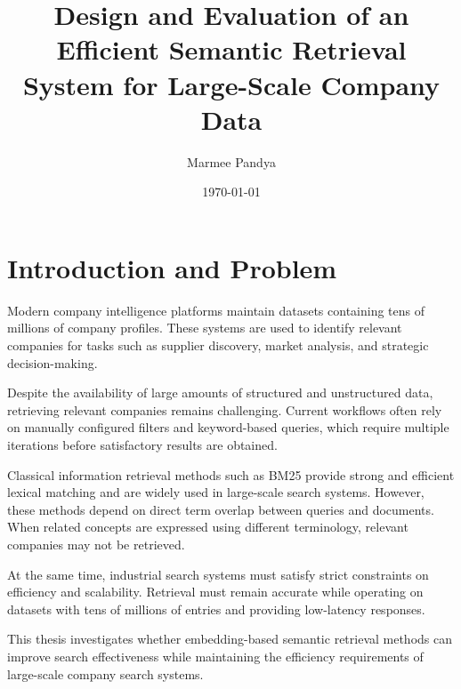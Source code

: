 \documentclass[a4paper]{scrartcl}
\title{Design and Evaluation of an Efficient Semantic Retrieval System for Large-Scale Company Data}
\author{Marmee Pandya}
\date{\today}
\begin{document}
\maketitle




\section{Introduction and Problem}

Modern company intelligence platforms maintain datasets containing tens of millions of company profiles. These systems are used to identify relevant companies for tasks such as supplier discovery, market analysis, and strategic decision-making.

Despite the availability of large amounts of structured and unstructured data, retrieving relevant companies remains challenging. Current workflows often rely on manually configured filters and keyword-based queries, which require multiple iterations before satisfactory results are obtained.

Classical information retrieval methods such as BM25 provide strong and efficient lexical matching and are widely used in large-scale search systems. However, these methods depend on direct term overlap between queries and documents. When related concepts are expressed using different terminology, relevant companies may not be retrieved.

At the same time, industrial search systems must satisfy strict constraints on efficiency and scalability. Retrieval must remain accurate while operating on datasets with tens of millions of entries and providing low-latency responses.

This thesis investigates whether embedding-based semantic retrieval methods can improve search effectiveness while maintaining the efficiency requirements of large-scale company search systems.
\end{document}
